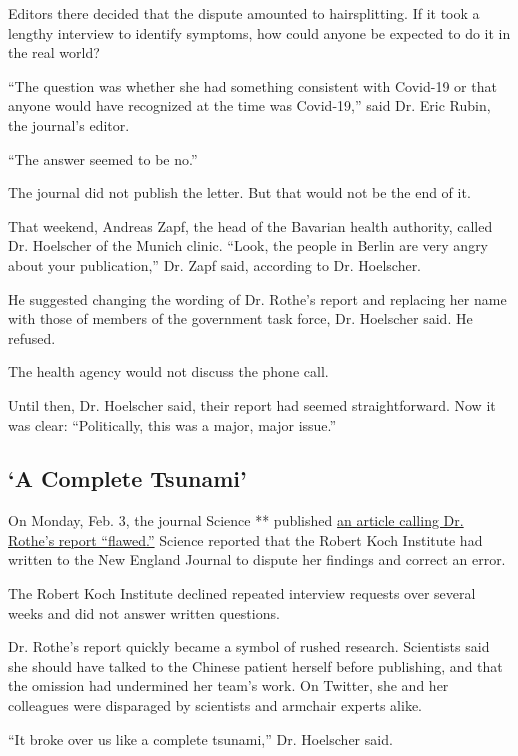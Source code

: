 Editors there decided that the dispute amounted to hairsplitting. If it
took a lengthy interview to identify symptoms, how could anyone be
expected to do it in the real world?

``The question was whether she had something consistent with Covid-19 or
that anyone would have recognized at the time was Covid-19,'' said Dr.
Eric Rubin, the journal's editor.

``The answer seemed to be no.''

The journal did not publish the letter. But that would not be the end of
it.

That weekend, Andreas Zapf, the head of the Bavarian health authority,
called Dr. Hoelscher of the Munich clinic. ``Look, the people in Berlin
are very angry about your publication,'' Dr. Zapf said, according to Dr.
Hoelscher.

He suggested changing the wording of Dr. Rothe's report and replacing
her name with those of members of the government task force, Dr.
Hoelscher said. He refused.

The health agency would not discuss the phone call.

Until then, Dr. Hoelscher said, their report had seemed straightforward.
Now it was clear: ``Politically, this was a major, major issue.''

\hypertarget{a-complete-tsunami}{%
\subsection{`A Complete Tsunami'}\label{a-complete-tsunami}}

On Monday, Feb. 3, the journal Science ** published
\href{https://www.sciencemag.org/news/2020/02/paper-non-symptomatic-patient-transmitting-coronavirus-wrong}{an
article calling Dr. Rothe's report ``flawed.''} Science reported that
the Robert Koch Institute had written to the New England Journal to
dispute her findings and correct an error.

The Robert Koch Institute declined repeated interview requests over
several weeks and did not answer written questions.

Dr. Rothe's report quickly became a symbol of rushed research.
Scientists said she should have talked to the Chinese patient herself
before publishing, and that the omission had undermined her team's work.
On Twitter, she and her colleagues were disparaged by scientists and
armchair experts alike.

``It broke over us like a complete tsunami,'' Dr. Hoelscher said.

